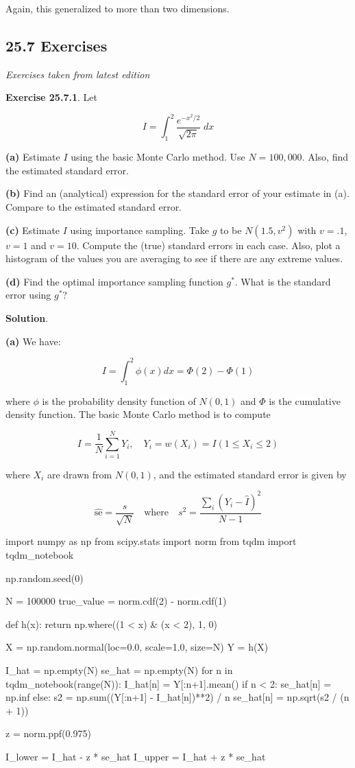 Again, this generalized to more than two dimensions.

\subsection*{25.7 Exercises}

\emph{Exercises taken from latest edition}

\textbf{Exercise 25.7.1}. Let

\[ I = \int_{1}^{2} \frac{e^{-x^{2} / 2}}{\sqrt{2 \pi}} \; dx \]

\textbf{(a)} Estimate \(I\) using the basic Monte Carlo method. Use
\(N = 100,000\). Also, find the estimated standard error.

\textbf{(b)} Find an (analytical) expression for the standard error of
your estimate in (a). Compare to the estimated standard error.

\textbf{(c)} Estimate \(I\) using importance sampling. Take \(g\) to be
\(N(1.5, v^{2})\) with \(v = .1\), \(v = 1\) and \(v = 10\). Compute the
(true) standard errors in each case. Also, plot a histogram of the
values you are averaging to see if there are any extreme values.

\textbf{(d)} Find the optimal importance sampling function \(g^*\). What
is the standard error using \(g^*\)?

\textbf{Solution}.

\textbf{(a)} We have:

\[ I = \int_{1}^{2} \phi(x) dx = \Phi(2) - \Phi(1) \]

where \(\phi\) is the probability density function of \(N(0, 1)\) and
\(\Phi\) is the cumulative density function. The basic Monte Carlo
method is to compute

\[ I = \frac{1}{N} \sum_{i=1}^N Y_{i},
\quad Y_{i} = w(X_{i}) = I(1 \leq X_{i} \leq 2)
\]

where \(X_{i}\) are drawn from \(N(0, 1)\), and the estimated standard
error is given by

\[ \hat{\text{se}} = \frac{s}{\sqrt{N}} 
\quad \text{where} \quad
s^{2} = \frac{\sum_{i} (Y_{i} - \hat{I})^{2}}{N - 1}
\]

\begin{python}
import numpy as np
from scipy.stats import norm
from tqdm import tqdm_{n}otebook

np.random.seed(0)

N = 100000
true_value = norm.cdf(2) - norm.cdf(1)

def h(x):
    return np.where((1 < x) & (x < 2), 1, 0)

X = np.random.normal(loc=0.0, scale=1.0, size=N)
Y = h(X)

I_hat = np.empty(N)
se_hat = np.empty(N)
for n in tqdm_{n}otebook(range(N)):
    I_hat[n] = Y[:n+1].mean()
    if n < 2:
        se_hat[n] = np.inf
    else:
        s2 = np.sum((Y[:n+1] - I_hat[n])**2) / n
        se_hat[n] = np.sqrt(s2 / (n + 1))
        
z = norm.ppf(0.975)

I_lower = I_hat - z * se_hat
I_upper = I_hat + z * se_hat
\end{python}

